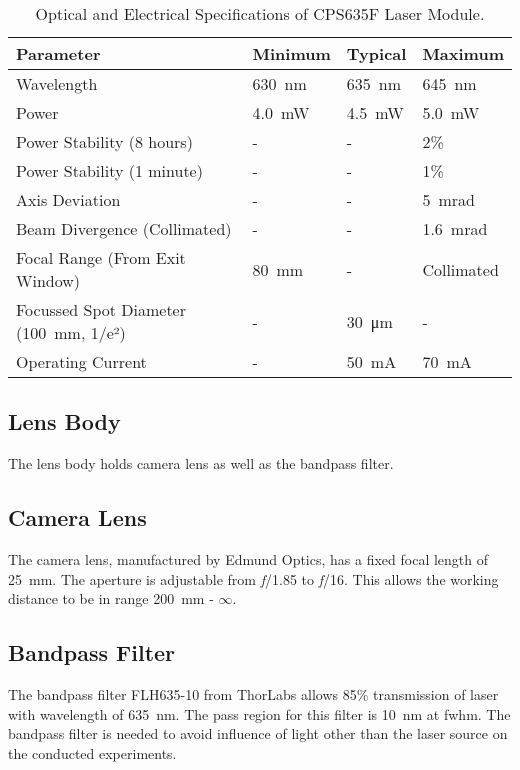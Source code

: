     \begin{table}[h]
        \centering
        \footnotesize
        \renewcommand{\arraystretch}{1.2}
        \begin{tabular}{p{6cm}p{2cm}p{2cm}p{2cm}}
            \toprule
            \textbf{Parameter} & \textbf{Minimum} & \textbf{Typical} & \textbf{Maximum} \\
            \midrule
            Wavelength & \SI{630}{\nano\meter} & \SI{635}{\nano\meter} & \SI{645}{\nano\meter} \\
            Power & \SI{4.0}{\milli\watt} & \SI{4.5}{\milli\watt} & \SI{5.0}{\milli\watt} \\
            Power Stability (8 hours) & - & - & 2\% \\
            Power Stability (1 minute) & - & - & 1\% \\
            Axis Deviation & - & - & \SI{5}{\milli\radian} \\
            Beam Divergence (Collimated) & - & - & \SI{1.6}{\milli\radian} \\
            Focal Range (From Exit Window) & \SI{80}{\milli\meter} & - & Collimated \\
            Focussed Spot Diameter (\SI{100}{\milli\meter}, 1/e²) & - & \SI{30}{\micro\meter} & - \\ 
            Operating Current & - & \SI{50}{\milli\ampere} & \SI{70}{\milli\ampere} \\
            \bottomrule
        \end{tabular}
        \caption{Optical and Electrical Specifications of CPS635F Laser Module. \cite{thorlabs_laser}}
        \label{table:laser_module_specs}
    \end{table}

\clearpage

\subsection{Lens Body}
    The lens body holds camera lens as well as the bandpass filter. 
    \subsection*{Camera Lens}
    The camera lens, manufactured by Edmund Optics, has a fixed focal length of \SI{25}{\milli\meter}. The aperture is adjustable from \emph{f}/1.85 to \emph{f}/16. This allows the working distance to be in range \SI{200}{\milli\meter} - $\infty$.

    \subsection*{Bandpass Filter}
    The bandpass filter FLH635-10 from ThorLabs allows 85\% transmission of laser with wavelength of \SI{635}{\nano\meter}. The pass region for this filter is \SI{10}{\nano\meter} at \gls{fwhm}. The bandpass filter is needed to avoid influence of light other than the laser source on the conducted experiments.

